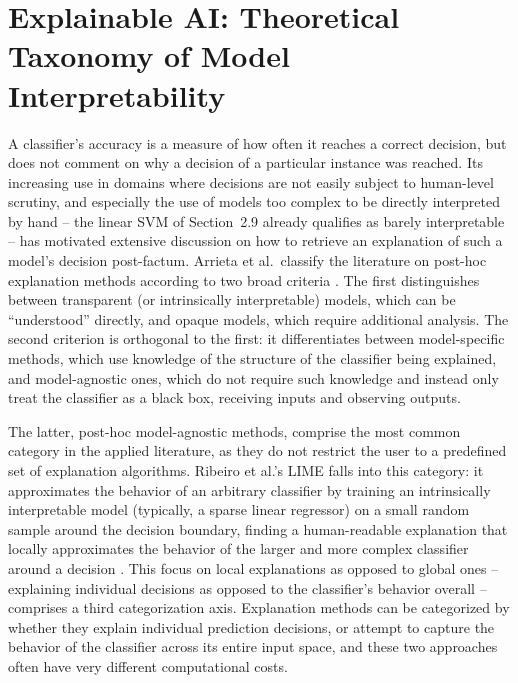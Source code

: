 \section{Explainable AI: Theoretical Taxonomy of Model Interpretability}

A classifier's accuracy is a measure of how often it reaches a correct decision, but does not comment on why a decision of a particular instance was reached. Its increasing use in domains where decisions are not easily subject to human-level scrutiny, and especially the use of models too complex to be directly interpreted by hand -- the linear SVM of Section~2.9 already qualifies as barely interpretable -- has motivated extensive discussion on how to retrieve an explanation of such a model's decision post-factum. Arrieta et al.\ classify the literature on post-hoc explanation methods according to two broad criteria \cite{arrieta2020explainable}. The first distinguishes between transparent (or intrinsically interpretable) models, which can be ``understood'' directly, and opaque models, which require additional analysis. The second criterion is orthogonal to the first: it differentiates between model-specific methods, which use knowledge of the structure of the classifier being explained, and model-agnostic ones, which do not require such knowledge and instead only treat the classifier as a black box, receiving inputs and observing outputs.

The latter, post-hoc model-agnostic methods, comprise the most common category in the applied literature, as they do not restrict the user to a predefined set of explanation algorithms. Ribeiro et al.'s LIME falls into this category: it approximates the behavior of an arbitrary classifier by training an intrinsically interpretable model (typically, a sparse linear regressor) on a small random sample around the decision boundary, finding a human-readable explanation that locally approximates the behavior of the larger and more complex classifier around a decision \cite{ribeiro2016why}. This focus on local explanations as opposed to global ones -- explaining individual decisions as opposed to the classifier's behavior overall -- comprises a third categorization axis. Explanation methods can be categorized by whether they explain individual prediction decisions, or attempt to capture the behavior of the classifier across its entire input space, and these two approaches often have very different computational costs.

